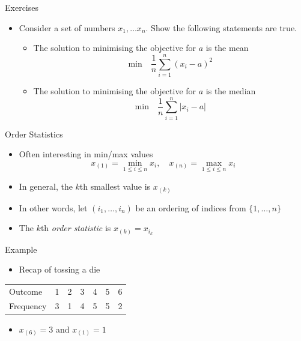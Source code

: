 \documentclass{beamer}
\begin{document}
\begin{frame}{Exercises}  
\begin{itemize} 
 \item Consider a set of numbers $x_1, \ldots x_n$. Show the following statements are true. 
\begin{itemize} 
\item The solution to minimising the objective for $a$ is the mean 
\begin{displaymath} 
 \mbox{min} \quad  \frac{1}{n}\sum_{i=1}^n (x_i - a)^2
\end{displaymath}
\item The solution to minimising the objective for $a$ is the median 
\begin{displaymath} 
 \mbox{min} \quad  \frac{1}{n}\sum_{i=1}^n |x_i - a|
\end{displaymath}
\end{itemize}
 \end{itemize}
\end{frame}

\begin{frame}{Order Statistics}  
\begin{itemize} 
 \item Often interesting in min/max values 
 \begin{displaymath} 
  x_{(1)} = \min_{1 \leq i \leq n} x_i, \quad x_{(n)} = \max_{1 \leq i \leq n} x_i
 \end{displaymath}
\item In general, the $k$th smallest value is $x_{(k)}$ 
\item In other words, let $(i_1, \ldots, i_n)$ be an ordering of indices from $\{1, \ldots, n\}$ 
\item The $k$th \emph{order statistic} is $x_{(k)} = x_{i_k}$
\end{itemize}
\end{frame}

\begin{frame}{Example}  
\begin{itemize} 
 \item Recap of tossing a die 
\end{itemize}

\begin{table}
  \begin{tabular}{l | l l l l l l }
\hline 
  Outcome & 1 & 2 & 3 & 4 & 5 & 6 \\ 
  Frequency & 3 & 1 & 4 & 5 & 5 & 2 \\
\hline 
  \end{tabular} 
\end{table}
\begin{itemize} 
 \item $x_{(6)} = 3$ and $x_{(1)} = 1$
\end{itemize}
\end{frame}
\end{document}
